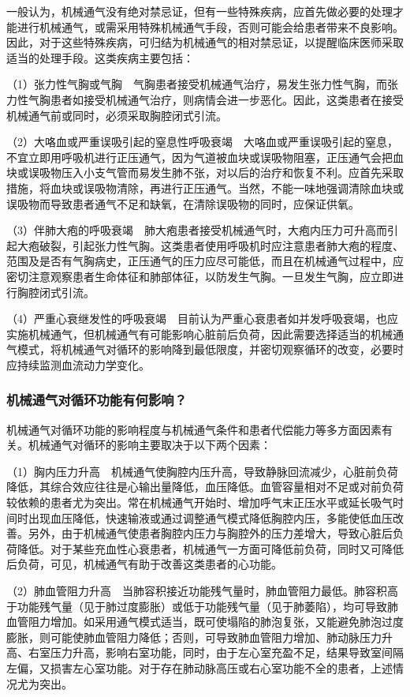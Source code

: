 一般认为，机械通气没有绝对禁忌证，但有一些特殊疾病，应首先做必要的处理才能进行机械通气，或需采用特殊机械通气手段，否则可能会给患者带来不良影响。因此，对于这些特殊疾病，可归结为机械通气的相对禁忌证，以提醒临床医师采取适当的处理手段。这类疾病主要包括：

（1）张力性气胸或气胸　气胸患者接受机械通气治疗，易发生张力性气胸，而张力性气胸患者如接受机械通气治疗，则病情会进一步恶化。因此，这类患者在接受机械通气前或同时，必须采取胸腔闭式引流。

（2）大咯血或严重误吸引起的窒息性呼吸衰竭　大咯血或严重误吸引起的窒息，不宜立即用呼吸机进行正压通气，因为气道被血块或误吸物阻塞，正压通气会把血块或误吸物压入小支气管而易发生肺不张，对以后的治疗和恢复不利。应首先采取措施，将血块或误吸物清除，再进行正压通气。当然，不能一味地强调清除血块或误吸物而导致患者通气不足和缺氧，在清除误吸物的同时，应保证供氧。

（3）伴肺大疱的呼吸衰竭　肺大疱患者接受机械通气时，大疱内压力可升高而引起大疱破裂，引起张力性气胸。这类患者使用呼吸机时应注意患者肺大疱的程度、范围及是否有气胸病史，正压通气的压力应尽可能低，而且在机械通气过程中，应密切注意观察患者生命体征和肺部体征，以防发生气胸。一旦发生气胸，应立即进行胸腔闭式引流。

（4）严重心衰继发性的呼吸衰竭　目前认为严重心衰患者如并发呼吸衰竭，也应实施机械通气，但机械通气有可能影响心脏前后负荷，因此需要选择适当的机械通气模式，将机械通气对循环的影响降到最低限度，并密切观察循环的改变，必要时应持续监测血流动力学变化。

\subsubsection{机械通气对循环功能有何影响？}

机械通气对循环功能的影响程度与机械通气条件和患者代偿能力等多方面因素有关。机械通气对循环的影响主要取决于以下两个因素：

（1）胸内压力升高　机械通气使胸腔内压升高，导致静脉回流减少，心脏前负荷降低，其综合效应往往是心输出量降低，血压降低。血管容量相对不足或对前负荷较依赖的患者尤为突出。常在机械通气开始时、增加呼气末正压水平或延长吸气时间时出现血压降低，快速输液或通过调整通气模式降低胸腔内压，多能使低血压改善。另外，由于机械通气使患者胸腔内压力与胸腔外的压力差增大，导致心脏后负荷降低。对于某些充血性心衰患者，机械通气一方面可降低前负荷，同时又可降低后负荷，可见，机械通气有助于改善这类患者的心功能。

（2）肺血管阻力升高　当肺容积接近功能残气量时，肺血管阻力最低。肺容积高于功能残气量（见于肺过度膨胀）或低于功能残气量（见于肺萎陷），均可导致肺血管阻力增加。如采用通气模式适当，既可使塌陷的肺泡复张，又能避免肺泡过度膨胀，则可能使肺血管阻力降低；否则，可导致肺血管阻力增加、肺动脉压力升高、右室压力升高，影响右室功能，同时，由于左心室充盈不足，结果导致室间隔左偏，又损害左心室功能。对于存在肺动脉高压或右心室功能不全的患者，上述情况尤为突出。


